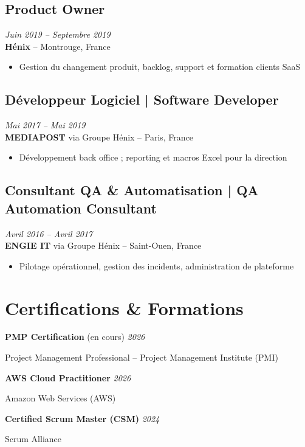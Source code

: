 \documentclass[11pt,a4paper]{article}
\begin{document}
\subsection*{Product Owner} \hfill \textit{Juin 2019 -- Septembre 2019}\\
\textbf{Hénix} -- Montrouge, France
\begin{itemize}
    \item Gestion du changement produit, backlog, support et formation clients SaaS
\end{itemize}

\subsection*{Développeur Logiciel | Software Developer} \hfill \textit{Mai 2017 -- Mai 2019}\\
\textbf{MEDIAPOST} via Groupe Hénix -- Paris, France
\begin{itemize}
    \item Développement back office ; reporting et macros Excel pour la direction
\end{itemize}

\subsection*{Consultant QA \& Automatisation | QA Automation Consultant} \hfill \textit{Avril 2016 -- Avril 2017}\\
\textbf{ENGIE IT} via Groupe Hénix -- Saint-Ouen, France
\begin{itemize}
    \item Pilotage opérationnel, gestion des incidents, administration de plateforme
\end{itemize}

\section*{Certifications \& Formations}

\textbf{PMP Certification} (en cours) \hfill \textit{2026}

Project Management Professional -- Project Management Institute (PMI)

\textbf{AWS Cloud Practitioner} \hfill \textit{2026}

Amazon Web Services (AWS)

\textbf{Certified Scrum Master (CSM)} \hfill \textit{2024}

Scrum Alliance
\end{document}

